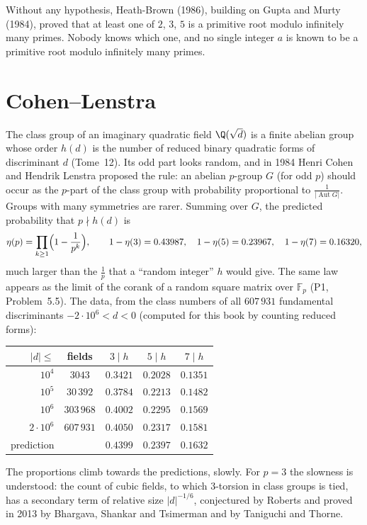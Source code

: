 \begin{remark}\label{rem:artinknown}
Without any hypothesis, Heath-Brown (1986), building on Gupta and Murty (1984), proved that at least one of $2$, $3$, $5$ is a primitive root modulo infinitely many
primes. Nobody knows which one, and no single integer $a$ is known to be a primitive root modulo infinitely many primes.
\end{remark}

\section{Cohen--Lenstra}

The class group of an imaginary quadratic field $\Q(\sqrt d)$ is a finite abelian group whose order $h(d)$ is the number of reduced binary quadratic
forms of discriminant $d$ (Tome~12). Its odd part looks random, and in 1984 Henri Cohen and Hendrik Lenstra proposed the rule: an abelian $p$-group $G$ (for odd $p$)
should occur as the $p$-part of the class group with probability proportional to $\frac1{|\operatorname{Aut}G|}$. Groups with many symmetries are rarer.
Summing over $G$, the predicted probability that $p\nmid h(d)$ is
\[
\eta(p)=\prod_{k\ge1}\Bigl(1-\frac1{p^k}\Bigr),\qquad1-\eta(3)=0.43987,\quad1-\eta(5)=0.23967,\quad1-\eta(7)=0.16320,
\]
much larger than the $\frac1p$ that a ``random integer'' $h$ would give. The same law appears as the limit of the corank of a random square matrix over
$\mathbb F_p$ (P1, Problem~5.5). The data, from the class numbers of all $607\,931$ fundamental discriminants $-2\cdot10^6<d<0$ (computed for this book by
counting reduced forms):

\begin{center}
\begin{tabular}{rcccc}
$|d|\le$&fields&$3\mid h$&$5\mid h$&$7\mid h$\\\hline
$10^4$&$3043$&$0.3421$&$0.2028$&$0.1351$\\
$10^5$&$30\,392$&$0.3784$&$0.2213$&$0.1482$\\
$10^6$&$303\,968$&$0.4002$&$0.2295$&$0.1569$\\
$2\cdot10^6$&$607\,931$&$0.4050$&$0.2317$&$0.1581$\\\hline
prediction&&$0.4399$&$0.2397$&$0.1632$
\end{tabular}
\end{center}

The proportions climb towards the predictions, slowly. For $p=3$ the slowness is understood: the count of cubic fields, to which $3$-torsion in class
groups is tied, has a secondary term of relative size $|d|^{-1/6}$, conjectured by Roberts and proved in 2013 by Bhargava, Shankar and Tsimerman and by
Taniguchi and Thorne.

